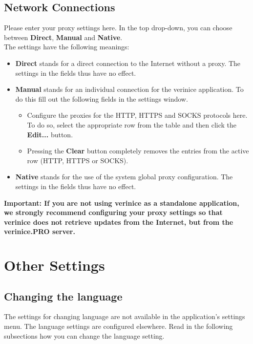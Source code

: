 \documentclass[a4paper,10pt]{book}
\begin{document}
\section{Network Connections}
Please enter your proxy settings here. In the top drop-down, you can choose between \textbf{Direct}, \textbf{Manual} and \textbf{Native}.
\newline\\
The settings have the following meanings:
\begin{itemize}
 \item \textbf{Direct} stands for a direct connection to the Internet without a proxy. The settings in the fields thus have no effect.
 \item \textbf{Manual} stands for an individual connection for the verinice application. To do this fill out the following fields in the settings window.
  \begin{itemize}
   \item Configure the proxies for the HTTP, HTTPS and SOCKS protocols here. To do so, select the appropriate row from the table and then click the \textbf{Edit...} button.
   \item Pressing the \textbf{Clear} button completely removes the entries from the active row (HTTP, HTTPS or SOCKS).
  \end{itemize}
 \item \textbf{Native} stands for the use of the system global proxy configuration. The settings in the fields thus have no effect.
\end{itemize}
\textbf{Important: If you are not using verinice as a standalone application, we strongly recommend configuring
your proxy settings so that verinice does not retrieve updates from the Internet, but from the
verinice.\textsc{PRO} server.}

\chapter{Other Settings}\label{chap:other-settings}
\section{Changing the language}
\label{sec:changing-language}

The settings for changing language are not available in the
application's settings menu. The language settings are configured
elsewhere. Read in the following subsections how you can change the
language setting.
\end{document}
